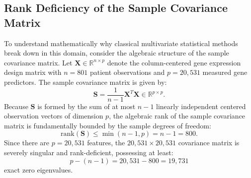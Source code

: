 \documentclass[11pt,a4paper]{article}
\begin{document}
\subsection{Rank Deficiency of the Sample Covariance Matrix}
To understand mathematically why classical multivariate statistical methods break down in this domain, consider the algebraic structure of the sample covariance matrix. Let $\mathbf{X} \in \mathbb{R}^{n \times p}$ denote the column-centered gene expression design matrix with $n = 801$ patient observations and $p = 20{,}531$ measured gene predictors. The sample covariance matrix is given by:
\begin{equation}
    \mathbf{S} = \frac{1}{n - 1} \mathbf{X}^T \mathbf{X} \in \mathbb{R}^{p \times p}.
\end{equation}
Because $\mathbf{S}$ is formed by the sum of at most $n - 1$ linearly independent centered observation vectors of dimension $p$, the algebraic rank of the sample covariance matrix is fundamentally bounded by the sample degrees of freedom:
\begin{equation}
    \mathrm{rank}(\mathbf{S}) \le \min(n - 1, p) = n - 1 = 800.
\end{equation}
Since there are $p = 20{,}531$ features, the $20{,}531 \times 20{,}531$ covariance matrix is severely singular and rank-deficient, possessing at least:
\begin{equation}
    p - (n - 1) = 20{,}531 - 800 = 19{,}731
\end{equation}
exact zero eigenvalues.
\end{document}
